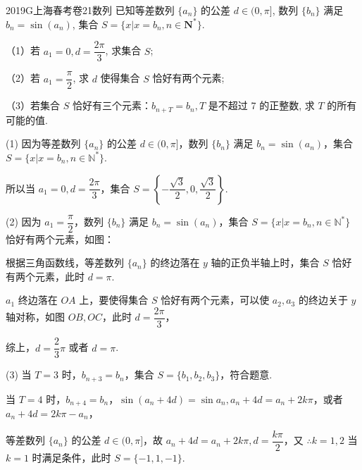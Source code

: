
\begin{problem}{2019}{G}{上海春考卷}{21}{数列}
已知等差数列 $\{a_n\}$ 的公差 $d \in (0, \pi]$, 数列 $\{b_n\}$ 满足 $b_n = \sin(a_n)$, 集合 $S=\{x|x=b_n, n \in \mathbf{N}^*\}$.

（1）若 $a_1=0, d=\dfrac{2\pi}{3}$, 求集合 $S$;

（2）若 $a_1=\dfrac{\pi}{2}$, 求 $d$ 使得集合 $S$ 恰好有两个元素;

（3）若集合 $S$ 恰好有三个元素：$b_{n+T}=b_n, T$ 是不超过 7 的正整数, 求 $T$ 的所有可能的值.
\end{problem}

\begin{solutions}
(1) 因为等差数列 $\{a_n\}$ 的公差 $d\in(0, \pi]$，数列 $\{b_n\}$ 满足 $b_n=\sin(a_n)$，集合 $S=\{x|x=b_n, n\in \mathbb{N}^*\}$.

所以当 $a_1=0, d=\dfrac{2\pi}{3}$，集合 $S=\left\{-\dfrac{\sqrt{3}}{2}, 0, \dfrac{\sqrt{3}}{2}\right\}$.

(2) 因为 $a_1=\dfrac{\pi}{2}$，数列 $\{b_n\}$ 满足 $b_n=\sin(a_n)$，集合 $S=\{x|x=b_n, n\in \mathbb{N}^*\}$ 恰好有两个元素，如图：

根据三角函数线，等差数列 $\{a_n\}$ 的终边落在 $y$ 轴的正负半轴上时，集合 $S$ 恰好有两个元素，此时 $d=\pi$.

$a_1$ 终边落在 $OA$ 上，要使得集合 $S$ 恰好有两个元素，可以使 $a_2, a_3$ 的终边关于 $y$ 轴对称，如图 $OB, OC$，此时 $d=\dfrac{2\pi}{3}$，

综上，$d=\dfrac{2}{3}\pi$ 或者 $d=\pi$.


(3) 
当 $T=3$ 时，$b_{n+3}=b_n$，集合 $S=\{b_1, b_2, b_3\}$，符合题意.

当 $T=4$ 时，$b_{n+4}=b_n$，$\sin(a_n+4d)=\sin a_n, a_n+4d=a_n+2k\pi$，或者 $a_n+4d=2k\pi-a_n$，

等差数列 $\{a_n\}$ 的公差 $d\in(0, \pi]$，故 $a_n+4d=a_n+2k\pi, d=\dfrac{k\pi}{2}$，又 $\therefore k=1, 2$
当 $k=1$ 时满足条件，此时 $S=\{-1, 1, -1\}$.

\begin{center}
\end{center}
\end{solutions}
